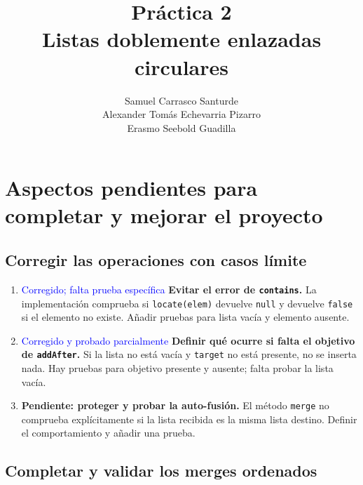 \documentclass[a4paper,11pt]{report}
\title{Práctica 2\\Listas doblemente enlazadas circulares}
\author{Samuel Carrasco Santurde\\Alexander Tomás Echevarria Pizarro\\Erasmo Seebold Guadilla}
\date{}
\begin{document}
\chapter{Aspectos pendientes para completar y mejorar el proyecto}


\section{Corregir las operaciones con casos límite}
\begin{enumerate}
  \item \textcolor{blue}{Corregido; falta prueba específica} \textbf{Evitar el error de \texttt{contains}.} La implementación comprueba si \texttt{locate(elem)} devuelve \texttt{null} y devuelve \texttt{false} si el elemento no existe. Añadir pruebas para lista vacía y elemento ausente.
  \item \textcolor{blue}{Corregido y probado parcialmente} \textbf{Definir qué ocurre si falta el objetivo de \texttt{addAfter}.} Si la lista no está vacía y \texttt{target} no está presente, no se inserta nada. Hay pruebas para objetivo presente y ausente; falta probar la lista vacía.
  \item \textbf{Pendiente: proteger y probar la auto-fusión.} El método \texttt{merge} no comprueba explícitamente si la lista recibida es la misma lista destino. Definir el comportamiento y añadir una prueba.
\end{enumerate}
\section{Completar y validar los merges ordenados}
\end{document}
